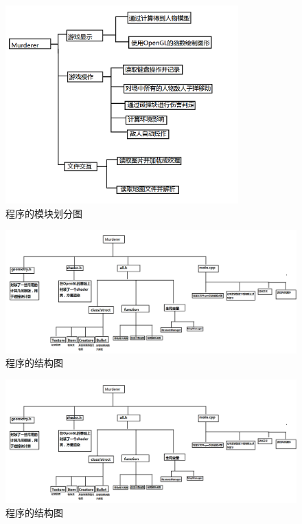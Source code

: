 \documentclass{beamer}
\begin{document}
\begin{frame}
    \begin{figure}[h]
        \centering
        \includegraphics[width=0.8\textwidth]{img/modules}
        \caption{程序的模块划分图}
    \end{figure}
\end{frame}

\begin{frame}
    \begin{figure}[h]
        \centering
        \includegraphics[width=1.1\textwidth]{img/structure}
        \caption{程序的结构图}
    \end{figure}
\end{frame}

\begin{frame}
    \begin{figure}[h]
        \centering
        \includegraphics[width=1.1\textwidth]{img/structure}
        \caption{程序的结构图}
    \end{figure}
\end{frame}
\end{document}
